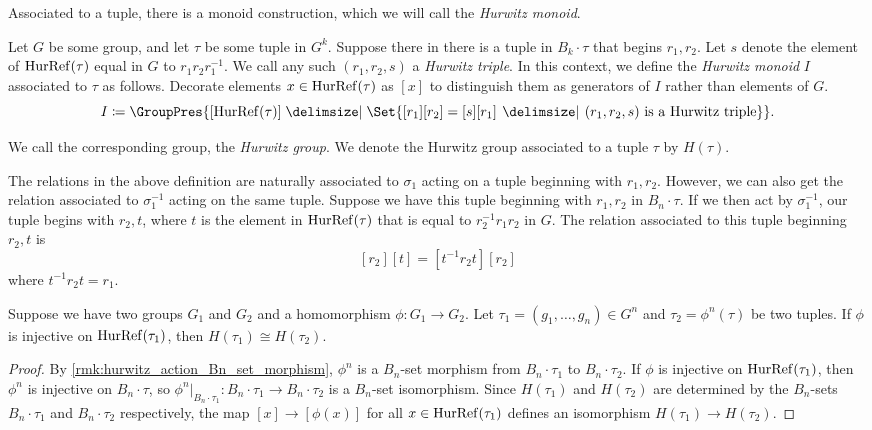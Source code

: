 Associated to a tuple, there is a monoid construction, which we will call the \emph{Hurwitz monoid}.
\begin{definition}
	\label{def:hurwitz_group}
	Let $G$ be some group, and let $\tau$ be some tuple  in $G^k$.
	Suppose there in there is a tuple in  $B_k \cdot \tau$ that begins $r_1,r_2$.
	Let $s$ denote the element of $\operatorname{HurRef}(\tau)$ equal in $G$ to  $r_1r_2r_1^{-1}$.
	We call any such $(r_1,r_2,s)$ a \emph{Hurwitz triple}.
	In this context, we define the \emph{Hurwitz monoid} $I$ associated to $\tau$ as follows.
	Decorate elements $x \in \operatorname{HurRef}(\tau)$ as $[x]$ to distinguish them as generators of $I$ rather than elements of $G$.
	\[
		I \coloneq \GroupPres{[\hurref(\tau)] \relations \Set{ [r_1][r_2] = [s][r_1] \given (r_1,r_2,s) \text{ is a Hurwitz triple}}}
		.\]
\end{definition}
We call the corresponding group, the \emph{Hurwitz group}.
We denote the Hurwitz group associated to a tuple $\tau$ by  $H(\tau)$.

\begin{remark}
	The relations in the above definition are naturally associated to $\sigma_1$ acting on a tuple beginning with $r_1,r_2$.
	However, we can also get the relation associated to  $\sigma_1^{-1}$ acting on the same tuple.
	Suppose we have this tuple beginning with $r_1,r_2$ in $B_n \cdot \tau$.
	If we then act by  $\sigma_1^{-1}$, our tuple begins with $r_2,t$, where $t$ is the element in  $\operatorname{HurRef}(\tau)$ that is equal to  $r_2^{-1}r_1r_2$ in $G$.
	The relation associated to this tuple beginning $r_2,t$ is
	\[
		[r_2][t]=[t^{-1}r_2t][r_2]
	\]
	where $t^{-1}r_2t=r_1$.
\end{remark}

\begin{lemma}
	\label{lem:inj_on_hurref_implies_iso_hurwitz_group}
	Suppose we have two groups $G_1$ and $G_2$ and a homomorphism $\phi \colon G_1 \to G_2$.
	Let $\tau_1 = (g_1,\ldots,g_n) \in G^n$ and $\tau_2 = \phi^n(\tau)$ be two tuples.
	If $\phi$ is injective on $\operatorname{HurRef}(\tau_1)$, then  $H(\tau_1) \cong H(\tau_2)$.
\end{lemma}
\begin{proof}
	By \cref{rmk:hurwitz_action_Bn_set_morphism}, $\phi^n$ is a $B_n$-set morphism from  $B_n \cdot \tau_1$ to $B_n \cdot \tau_2$.
	If $\phi$ is injective on $\operatorname{HurRef}(\tau_1)$, then $\phi^n$ is injective on  $B_n \cdot \tau$, so  $\phi^n|_{B_n\cdot \tau_1} \colon B_n \cdot \tau_1 \to B_n \cdot \tau_2$ is a  $B_n$-set isomorphism.
	Since $H(\tau_1)$ and  $H(\tau_2)$ are determined by the  $B_n$-sets  $B_n \cdot \tau_1$ and $B_n \cdot \tau_2$ respectively, the map $[x] \to [\phi(x)]$ for all $x \in \operatorname{HurRef}(\tau_1)$ defines an isomorphism  $H(\tau_1) \to H(\tau_2)$.
\end{proof}

